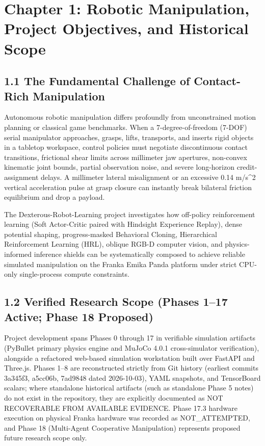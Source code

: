 \chapter{Chapter 1: Robotic Manipulation, Project Objectives, and Historical Scope}
\section{1.1 The Fundamental Challenge of Contact-Rich Manipulation}
Autonomous robotic manipulation differs profoundly from unconstrained motion planning or classical game benchmarks. When a 7-degree-of-freedom (7-DOF) serial manipulator approaches, grasps, lifts, transports, and inserts rigid objects in a tabletop workspace, control policies must negotiate discontinuous contact transitions, frictional shear limits across millimeter jaw apertures, non-convex kinematic joint bounds, partial observation noise, and severe long-horizon credit-assignment delays. A millimeter lateral misalignment or an excessive 0.14 m/s^2 vertical acceleration pulse at grasp closure can instantly break bilateral friction equilibrium and drop a payload.

The Dexterous-Robot-Learning project investigates how off-policy reinforcement learning (Soft Actor-Critic paired with Hindsight Experience Replay), dense potential shaping, progress-masked Behavioral Cloning, Hierarchical Reinforcement Learning (HRL), oblique RGB-D computer vision, and physics-informed inference shields can be systematically composed to achieve reliable simulated manipulation on the Franka Emika Panda platform under strict CPU-only single-process compute constraints.

\section{1.2 Verified Research Scope (Phases 1–17 Active; Phase 18 Proposed)}
Project development spans Phases 0 through 17 in verifiable simulation artifacts (PyBullet primary physics engine and MuJoCo 4.0.1 cross-simulator verification), alongside a refactored web-based simulation workstation built over FastAPI and Three.js. Phases 1–8 are reconstructed strictly from Git history (earliest commits 3a345f3, a5cc06b, 7ad9848 dated 2026-10-03), YAML snapshots, and TensorBoard scalars; where standalone historical artifacts (such as standalone Phase 5 notes) do not exist in the repository, they are explicitly documented as NOT RECOVERABLE FROM AVAILABLE EVIDENCE. Phase 17.3 hardware execution on physical Franka hardware was recorded as NOT\_ATTEMPTED, and Phase 18 (Multi-Agent Cooperative Manipulation) represents proposed future research scope only.

